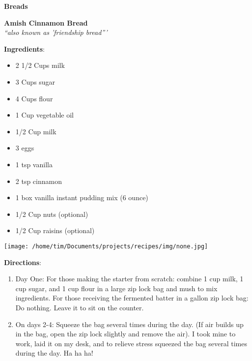 \documentclass[11pt, twoside, openany]{book}
\begin{document}
{\newpage \LARGE \textbf{Breads}} \label{breads}\\
\noindent\begin{minipage}[t]{\linewidth}%
{\Large\textbf{Amish Cinnamon Bread}} \label{amish-cinnamon-bread}\hfill\textit{}\\
\textit{``also known as 'friendship bread'''}\\
\noindent\begin{minipage}[t]{0.78\linewidth}%
\textbf{Ingredients}:\vspace{-3mm}
\begin{multicols}{2}
\begin{itemize}\setlength\itemsep{-1mm}
\item 2 1/2 Cups milk
\item 3 Cups sugar
\item 4 Cups flour
\item 1 Cup vegetable oil
\item 1/2 Cup milk
\item 3 eggs
\item 1 tsp vanilla
\item 2 tsp cinnamon
\item 1 box vanilla instant pudding mix (6 ounce)
\item 1/2 Cup nuts (optional)
\item 1/2 Cup raisins (optional)
\end{itemize}
\end{multicols}
\end{minipage}
\noindent\begin{minipage}[t]{0.18\linewidth}
\centering \strut\vspace*{-\baselineskip}\newline
\texttt{[image: /home/tim/Documents/projects/recipes/img/none.jpg]}\\
\end{minipage}\vspace{3mm}
\textbf{Directions}:
\vspace{-3mm}\begin{enumerate}\setlength\itemsep{-1mm}
\item Day One: For those making the starter from scratch: combine 1 cup milk, 1 cup sugar, and 1 cup flour in a large zip lock bag and mush to mix ingredients. For those receiving the fermented batter in a gallon zip lock bag: Do nothing. Leave it to sit on the counter.
\item On days 2-4: Squeeze the bag several times during the day. (If air builds up in the bag, open the zip lock slightly and remove the air). I took mine to work, laid it on my desk, and to relieve stress squeezed the bag several times during the day. Ha ha ha!

\end{enumerate}
\end{minipage}
\end{document}
